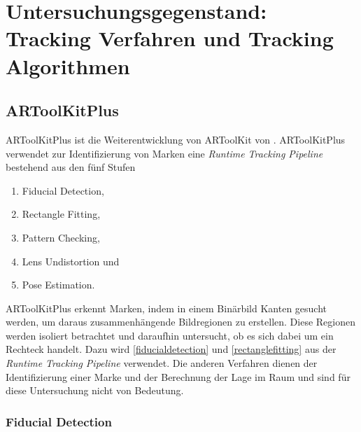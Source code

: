 \section{Untersuchungsgegenstand: Tracking Verfahren und Tracking Algorithmen} %
\label{sec:untersuchungsgegenstand}
\begin{comment}
	Untersuchungsgegenstand: Verfahren und Algorithmen präzise vorstellen und ihre Unterschiede hervorheben.
	Notwendige Kriterien der Algorithmen bestimmen

	Grober Ablauf der Verfahren:
	* Wer hats erfunden?
	* Wie ist das Verfahren aufgebaut (Algo in grob)
	* Welche Kriterien müssen erfüllt sein (monochrom, rgb eingabe)?
\end{comment}

\subsection{ARToolKitPlus} %
\label{sub:artoolkitplus}

ARToolKitPlus ist die Weiterentwicklung von ARToolKit von \citeauthor{wagner07b}. ARToolKitPlus verwendet zur
Identifizierung von Marken eine \textit{Runtime Tracking Pipeline} bestehend aus den fünf Stufen

\begin{enumerate}
	\item Fiducial Detection, \label{fiducialdetection}
	\item Rectangle Fitting, \label{rectanglefitting}
	\item Pattern Checking,
	\item Lens Undistortion und
	\item Pose Estimation.
\end{enumerate}

ARToolKitPlus erkennt Marken, indem in einem Binärbild Kanten gesucht werden, um daraus zusammenhängende Bildregionen
 zu erstellen. Diese Regionen werden isoliert betrachtet und daraufhin untersucht, ob es sich dabei um ein Rechteck
 handelt. Dazu wird \autoref{fiducialdetection} und \autoref{rectanglefitting} aus der
 \textit{Runtime Tracking Pipeline} verwendet. Die anderen Verfahren dienen der Identifizierung einer Marke und der
 Berechnung der Lage im Raum und sind für diese Untersuchung nicht von Bedeutung.

\subsubsection{Fiducial Detection} %
\label{sub:fiducial_detection}

